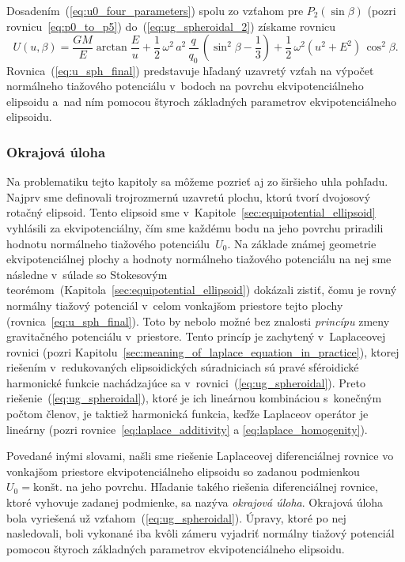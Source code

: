 \documentclass[a4paper, 12pt]{book}
\begin{document}
Dosadením~(\ref{eq:u0_four_parameters}) spolu zo vzťahom pre $P_2(\sin\beta)$ 
(pozri rovnicu~\ref{eq:p0_to_p5}) do~(\ref{eq:ug_spheroidal_2}) získame rovnicu
%
\begin{equation}
\label{eq:u_sph_final}
U(u, \beta) = \frac{GM}{E} \arctan\frac{E}{u} + \frac{1}{2} \, \omega^2 \, a^2 
\, \frac{q}{q_0} \, \left( \sin^2\beta - \frac{1}{3} \right) + \frac{1}{2} \, 
\omega^2 (u^2 + E^2) \, \cos^2\beta{.}
\end{equation}
%
Rovnica~(\ref{eq:u_sph_final}) predstavuje hľadaný uzavretý vzťah na výpočet 
normálneho tiažového potenciálu v~bodoch na povrchu ekvipotenciálneho elipsoidu 
a~nad ním pomocou štyroch základných parametrov ekvipotenciálneho elipsoidu.



\subsubsection{Okrajová úloha}
\label{sec:u_boundary_value_problem}

Na problematiku tejto kapitoly sa môžeme pozrieť aj zo širšieho uhla pohľadu.  
Najprv sme definovali trojrozmernú uzavretú plochu, ktorú tvorí dvojosový 
rotačný elipsoid.  Tento elipsoid sme 
v~Kapitole~\ref{sec:equipotential_ellipsoid} vyhlásili za ekvipotenciálny, čím 
sme každému bodu na jeho povrchu priradili hodnotu normálneho tiažového 
potenciálu~$U_0$.  Na základe známej geometrie ekvipotenciálnej plochy 
a hodnoty normálneho tiažového potenciálu na nej sme následne v~súlade so 
Stokesovým teorémom~(Kapitola~\ref{sec:equipotential_ellipsoid}) dokázali 
zistiť, čomu je rovný normálny tiažový potenciál v~celom vonkajšom priestore 
tejto plochy (rovnica~\ref{eq:u_sph_final}).  Toto by nebolo možné bez znalosti 
\emph{princípu} zmeny gravitačného potenciálu v~priestore.  Tento princíp je 
zachytený v~Laplaceovej rovnici (pozri 
Kapitolu~\ref{sec:meaning_of_laplace_equation_in_practice}), ktorej riešením 
v~redukovaných elipsoidických súradniciach sú pravé sféroidické harmonické 
funkcie nachádzajúce sa v~rovnici~(\ref{eq:ug_spheroidal}).  Preto 
riešenie~(\ref{eq:ug_spheroidal}), ktoré je ich lineárnou kombináciou 
s~konečným počtom členov, je taktiež harmonická funkcia, keďže Laplaceov 
operátor je lineárny (pozri rovnice~\ref{eq:laplace_additivity} 
a \ref{eq:laplace_homogenity}).

Povedané inými slovami, našli sme riešenie Laplaceovej diferenciálnej rovnice 
vo vonkajšom priestore ekvipotenciálneho elipsoidu so zadanou podmienkou~$U_0 
= \textrm{konšt.}$ na jeho povrchu.  Hľadanie takého riešenia diferenciálnej 
rovnice, ktoré vyhovuje zadanej podmienke, sa nazýva \emph{okrajová úloha}.  
Okrajová úloha bola vyriešená už vzťahom~(\ref{eq:ug_spheroidal}).  Úpravy, 
ktoré po nej nasledovali, boli vykonané iba kvôli zámeru vyjadriť normálny 
tiažový potenciál pomocou štyroch základných parametrov ekvipotenciálneho 
elipsoidu.
\end{document}
